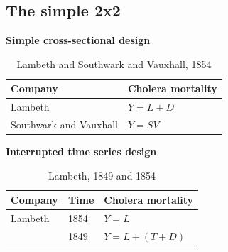 \documentclass[notes=show]{beamer}
\begin{document}
\subsection{The simple 2x2}


\begin{frame}
\begin{center}
\textbf{Simple cross-sectional design}
\end{center}

\begin{table}\centering
		\caption{Lambeth and Southwark and Vauxhall, 1854}
		\begin{center}
		\begin{tabular}{ll}
		\toprule
		\multicolumn{1}{l}{\textbf{Company}}&
		\multicolumn{1}{c}{\textbf{Cholera mortality}}\\
		\midrule
		Lambeth  & $Y=L + D$ \\
		\midrule
		Southwark and Vauxhall  & $Y=SV$ \\
		\bottomrule
		\end{tabular}
		\end{center}
	\end{table}

\end{frame}

\begin{frame}[plain]
\begin{center}
\textbf{Interrupted time series design}
\end{center}

	\begin{table}\centering
		\caption{Lambeth, 1849 and 1854}
		\begin{center}
		\begin{tabular}{lll}
		\toprule
		\multicolumn{1}{l}{\textbf{Company}}&
		\multicolumn{1}{c}{\textbf{Time}}&
		\multicolumn{1}{c}{\textbf{Cholera mortality}}\\
		\midrule
		Lambeth & 1854 & $Y=L$ \\
		& 1849 & $Y=L + (T + D)$ \\
		\bottomrule
		\end{tabular}
		\end{center}
	\end{table}

\end{frame}
\end{document}
